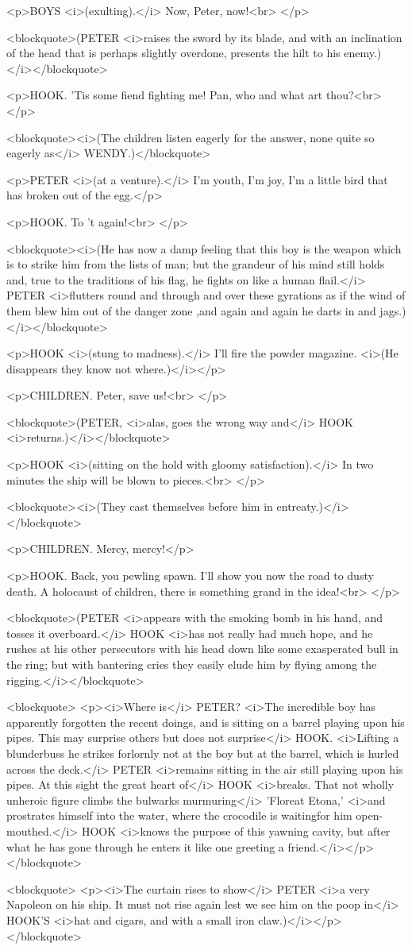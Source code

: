 <p>BOYS <i>(exulting).</i> Now, Peter, now!<br>
</p>

<blockquote>(PETER <i>raises the sword by its blade, and with an
inclination of the head that is perhaps slightly overdone, presents
the hilt to his enemy.)</i></blockquote>

<p>HOOK. 'Tis some fiend fighting me! Pan, who and what art thou?<br>
</p>

<blockquote><i>(The children listen eagerly for the answer, none
quite so eagerly as</i> WENDY.)</blockquote>

<p>PETER <i>(at a venture).</i> I'm youth, I'm joy, I'm a little bird
that has broken out of the egg.</p>

<p>HOOK. To 't again!<br>
</p>

<blockquote><i>(He has now a damp feeling that this boy is the weapon
which is to strike him from the lists of man; but the grandeur of his
mind still holds and, true to the traditions of his flag, he fights
on like a human flail.</i> PETER <i>flutters round and through and
over these gyrations as if the wind of them blew him out of the
danger zone ,and again and again he darts in and
jags.)</i></blockquote>

<p>HOOK <i>(stung to madness).</i> I'll fire the powder magazine.
<i>(He disappears they know not where.)</i></p>

<p>CHILDREN. Peter, save us!<br>
</p>

<blockquote>(PETER, <i>alas, goes the wrong way and</i> HOOK
<i>returns.)</i></blockquote>

<p>HOOK <i>(sitting on the hold with gloomy satisfaction).</i> In two
minutes the ship will be blown to pieces.<br>
</p>

<blockquote><i>(They cast themselves before him in
entreaty.)</i></blockquote>

<p>CHILDREN. Mercy, mercy!</p>

<p>HOOK. Back, you pewling spawn. I'll show you now the road to dusty
death. A holocaust of children, there is something grand in the
idea!<br>
</p>

<blockquote>(PETER <i>appears with the smoking bomb in his hand, and
tosses it overboard.</i> HOOK <i>has not really had much hope, and he
rushes at his other persecutors with his head down like some
exasperated bull in the ring; but with bantering cries they easily
elude him by flying among the rigging.</i></blockquote>

<blockquote>
<p><i>Where is</i> PETER? <i>The incredible boy has apparently
forgotten the recent doings, and is sitting on a barrel playing upon
his pipes. This may surprise others but does not surprise</i> HOOK.
<i>Lifting a blunderbuss he strikes forlornly not at the boy but at
the barrel, which is hurled across the deck.</i> PETER <i>remains
sitting in the air still playing upon his pipes. At this sight the
great heart of</i> HOOK <i>breaks. That not wholly unheroic figure
climbs the bulwarks murmuring</i> 'Floreat Etona,' <i>and prostrates
himself into the water, where the crocodile is waitingfor him
open-mouthed.</i> HOOK <i>knows the purpose of this yawning cavity,
but after what he has gone through he enters it like one greeting a
friend.</i></p>
</blockquote>

<blockquote>
<p><i>The curtain rises to show</i> PETER <i>a very Napoleon on his
ship. It must not rise again lest we see him on the poop in</i>
HOOK'S <i>hat and cigars, and with a small iron claw.)</i></p>
</blockquote>
